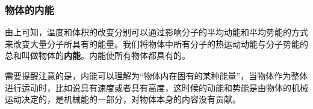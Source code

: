 \subsubsection{物体的内能}
由上可知，温度和体积的改变分别可以通过影响分子的平均动能和平均势能的方式来改变大量分子所具有的能量。我们将物体中所有分子的热运动动能与分子势能的总和叫做物体的\textbf{内能}。内能使所有物体都具有的。

需要提醒注意的是，内能可以理解为“物体内在固有的某种能量”，当物体作为整体进行运动时，比如说具有速度或者具有高度，这时候的动能和势能是由物体的机械运动决定的，是机械能的一部分，对物体本身的内容没有贡献。




